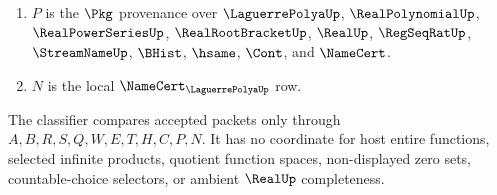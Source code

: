 \begin{definition}
\begin{enumerate}
\item $P$ is the $\Pkg$ provenance over $\LaguerrePolyaUp$, $\RealPolynomialUp$, $\RealPowerSeriesUp$, $\RealRootBracketUp$, $\RealUp$, $\RegSeqRatUp$, $\StreamNameUp$, $\BHist$, $\hsame$, $\Cont$, and $\NameCert$.
\item $N$ is the local $\NameCert_{\LaguerrePolyaUp}$ row.
\end{enumerate}
The classifier compares accepted packets only through $A,B,R,S,Q,W,E,T,H,C,P,N$. It has no coordinate for host entire functions, selected infinite products, quotient function spaces, non-displayed zero sets, countable-choice selectors, or ambient $\RealUp$ completeness.
\end{definition}

